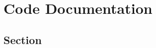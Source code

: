 \chapter{Code Documentation}
\label{apx:documentation}
\tightlists %
\lipsum[1]

\tocless\section{Section} %
\lipsum[2]


	
